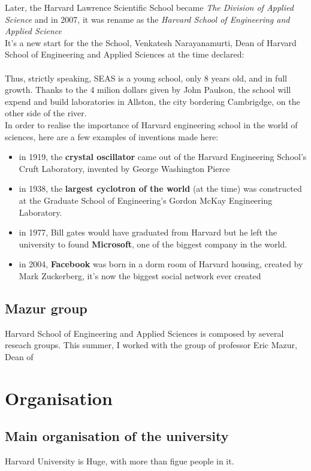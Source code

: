 \documentclass[12pt,a4paper]{article}
\newcommand{\hseas}{Harvard School of Engineering and Applied Sciences}
\begin{document}
Later, the Harvard Lawrence Scientific School became \textit{The Division of Applied Science} and in 2007, it was rename as the \textit{Harvard School of Engineering and Applied Science}\\
It's a new start for the the School, Venkatesh Narayanamurti, Dean of Harvard School of Engineering and Applied Sciences at the time declared:\\
\\

Thus, strictly speaking, SEAS is a young school, only 8 years old, and in full growth. Thanks to the 4 milion dollars given by John Paulson, the school will expend and build laboratories in Allston, the city bordering Cambrigdge, on the other side of the river.\\

In order to realise the importance of Harvard engineering school in the world of sciences, here are a few examples of inventions made here:
\begin{itemize}
\item in 1919, the \textbf{crystal oscillator} came out of the Harvard Engineering School’s Cruft Laboratory, invented by George Washington Pierce
\item in 1938, the \textbf{largest cyclotron of the world} (at the time) was constructed at the Graduate School of Engineering's Gordon McKay Engineering Laboratory.
\item in 1977, Bill gates would have graduated from Harvard but he left the university  to found \textbf{Microsoft}, one of the biggest company in the world.
\item in 2004, \textbf{Facebook} was born in a dorm room of Harvard housing, created by Mark Zuckerberg, it's now the biggest social network ever created
\end{itemize}

\subsection{Mazur group}

\hseas{} is composed by several reseach groups. This summer, I worked with the group of professor Eric Mazur, Dean of\\

\section{Organisation}
\subsection{Main organisation of the university}
Harvard University is Huge, with more than figue people in it.
\end{document}
